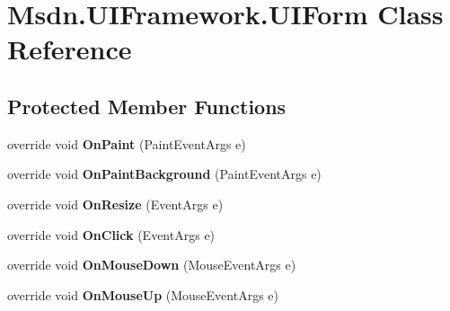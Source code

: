 \hypertarget{class_msdn_1_1_u_i_framework_1_1_u_i_form}{
\section{Msdn.UIFramework.UIForm Class Reference}
\label{class_msdn_1_1_u_i_framework_1_1_u_i_form}
}
\subsection*{Protected Member Functions}
\begin{DoxyCompactItemize}
\item 
\hypertarget{class_msdn_1_1_u_i_framework_1_1_u_i_form_ab0eed1711c3c52621d499b28496022ef}{
override void {\bfseries OnPaint} (PaintEventArgs e)}
\label{class_msdn_1_1_u_i_framework_1_1_u_i_form_ab0eed1711c3c52621d499b28496022ef}

\item 
\hypertarget{class_msdn_1_1_u_i_framework_1_1_u_i_form_a49063376e71aa9fff8b5f6c7da7df9bd}{
override void {\bfseries OnPaintBackground} (PaintEventArgs e)}
\label{class_msdn_1_1_u_i_framework_1_1_u_i_form_a49063376e71aa9fff8b5f6c7da7df9bd}

\item 
\hypertarget{class_msdn_1_1_u_i_framework_1_1_u_i_form_a9a477a9daa2daee5972ed9c0cb425dce}{
override void {\bfseries OnResize} (EventArgs e)}
\label{class_msdn_1_1_u_i_framework_1_1_u_i_form_a9a477a9daa2daee5972ed9c0cb425dce}

\item 
\hypertarget{class_msdn_1_1_u_i_framework_1_1_u_i_form_a4d4d71ec876154e06e90251367a09ed4}{
override void {\bfseries OnClick} (EventArgs e)}
\label{class_msdn_1_1_u_i_framework_1_1_u_i_form_a4d4d71ec876154e06e90251367a09ed4}

\item 
\hypertarget{class_msdn_1_1_u_i_framework_1_1_u_i_form_a5021c1faba4ca3b67993f247f1ac346c}{
override void {\bfseries OnMouseDown} (MouseEventArgs e)}
\label{class_msdn_1_1_u_i_framework_1_1_u_i_form_a5021c1faba4ca3b67993f247f1ac346c}

\item 
\hypertarget{class_msdn_1_1_u_i_framework_1_1_u_i_form_abf9cd818fa5c00927681aa135e9dae1c}{
override void {\bfseries OnMouseUp} (MouseEventArgs e)}
\label{class_msdn_1_1_u_i_framework_1_1_u_i_form_abf9cd818fa5c00927681aa135e9dae1c}

\end{DoxyCompactItemize}
